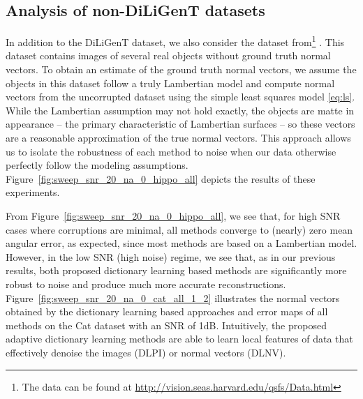 \subsection{Analysis of non-DiLiGenT datasets}
In addition to the DiLiGenT dataset, we also consider the dataset from\footnote{The data can be found at \url{http://vision.seas.harvard.edu/qsfs/Data.html}} \cite{xiong2015shading}. This dataset contains images of several real objects without ground truth normal vectors. To obtain an estimate of the ground truth normal vectors, we assume the objects in this dataset follow a truly Lambertian model and compute normal vectors from the uncorrupted dataset using the simple least squares model \eqref{eq:ls}. While the Lambertian assumption may not hold exactly, the objects are matte in appearance -- the primary characteristic of Lambertian surfaces -- so these vectors are a reasonable approximation of the true normal vectors. This approach allows us to isolate the robustness of each method to noise when our data otherwise perfectly follow the modeling assumptions. Figure~\ref{fig:sweep_snr_20_na_0_hippo_all} depicts the results of these experiments.



From Figure~\ref{fig:sweep_snr_20_na_0_hippo_all}, we see that, for high SNR cases where corruptions are minimal, all methods converge to (nearly) zero mean angular error, as expected, since most methods are based on a Lambertian model. However, in the low SNR (high noise) regime, we see that, as in our previous results, both proposed dictionary learning based methods are significantly more robust to noise and produce much more accurate reconstructions. Figure~\ref{fig:sweep_snr_20_na_0_cat_all_1_2} illustrates the normal vectors obtained by the dictionary learning based approaches and error maps of all methods on the Cat dataset with an SNR of 1dB. Intuitively, the proposed adaptive dictionary learning methods are able to learn local features of data that effectively denoise the images (DLPI) or normal vectors (DLNV).








